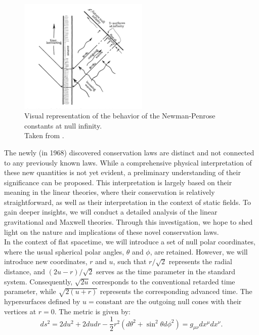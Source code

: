\begin{figure}[h]
  \centering \includegraphics[width =0.55\textwidth]{penrose constants.png}
    \caption{Visual representation of the behavior of the Newman-Penrose constants at null infinity.\\
    Taken from \cite{NewPen68}.}
\end{figure}

The newly (in 1968) discovered conservation laws are distinct and not connected to any previously known laws. While a comprehensive physical interpretation of these new quantities is not yet evident, a preliminary understanding of their significance can be proposed. This interpretation is largely based on their meaning in the linear theories, where their conservation is relatively straightforward, as well as their interpretation in the context of static fields. To gain deeper insights, we will conduct a detailed analysis of the linear gravitational and Maxwell theories. Through this investigation, we hope to shed light on the nature and implications of these novel conservation laws.\\

In the context of flat spacetime, we will introduce a set of null polar coordinates, where the usual spherical polar angles, $\theta$ and $\phi$, are retained. However, we will introduce new coordinates, $r$ and $u$, such that $r/\sqrt{2}$ represents the radial distance, and $(2u - r)/\sqrt{2}$ serves as the time parameter in the standard system. Consequently, $\sqrt{2u}$ corresponds to the conventional retarded time parameter, while $\sqrt{2(u + r)}$ represents the corresponding advanced time. The hypersurfaces defined by $u = \text{constant}$ are the outgoing null cones with their vertices at $r = 0$. The metric is given by:
\begin{equation}\label{eq:flatmetric}
  d s^2 = 2d u^2 + 2dudr - \frac{1}{2} r^2(d\theta^{2} + \sin^2\theta d\phi^2) = g_{\mu \nu}dx^{\mu}dx^{\nu}.
\end{equation}

